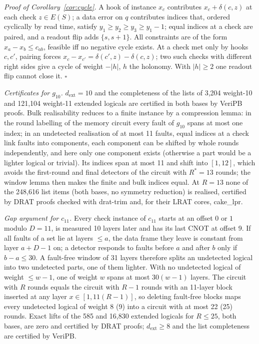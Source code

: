 \documentclass[aps,prl,twocolumn,superscriptaddress,nofootinbib]{revtex4-2}
\newif\ifshowclaimtags \showclaimtagsfalse
\newcommand{\cl}[1]{\ifshowclaimtags\textsuperscript{\textcolor{blue}{\scriptsize[#1]}}\fi}
\newcommand{\dext}{d_{\mathrm{ext}}}
\begin{document}
\emph{Proof of Corollary~\ref{cor:cycle}.} A hook of instance $x_c$ contributes
$x_c+\delta(c,z)$ at each check $z\in E(S)$; a data error on $q$ contributes indices that,
ordered cyclically by read time, satisfy $y_1\ge y_2\ge y_3\ge y_1-1$; equal indices at a
check are paired, and a readout flip adds $\{s,s+1\}$. All constraints are of the form
$x_a-x_b\le c_{ab}$, feasible iff no negative cycle exists. At a check met only by hooks
$c,c'$, pairing forces $x_c-x_{c'}=\delta(c',z)-\delta(c,z)$; two such checks with different
right sides give a cycle of weight $-|h|$, $h$ the holonomy. With $|h|\ge2$ one readout flip
cannot close it. $\square$

\emph{Certificates for $g_{10}$.} $\dext=10$ and the completeness of the lists of 3,204
weight-10 and 121,104 weight-11 extended logicals are certified in both bases by VeriPB
proofs. Bulk realisability reduces to a finite instance by a compression lemma: in the
round labelling of the memory circuit every fault of $g_{10}$ spans at most one index; in
an undetected realisation of at most 11 faults, equal indices at a check link faults into
components, each component can be shifted by whole rounds independently, and here only one
component exists (otherwise a part would be a lighter logical or trivial). Its indices
span at most 11 and shift into $[1,12]$, which avoids the first-round and final detectors
of the circuit with $R^*=13$ rounds; the window lemma then makes the finite and bulk
indices equal. At $R=13$ none of the 248,616 list items (both bases, no symmetry
reduction) is realised, certified by DRAT proofs checked with drat-trim and, for their LRAT
cores, cake\_lpr\cl{L-25}.

\emph{Gap argument for $c_{11}$.} Every check instance of $c_{11}$ starts at an offset
$0$ or $1$ modulo $D=11$, is measured 10 layers later and has its last CNOT at offset 9.
If all faults of a set lie at layers $\le a$, the data frame they leave is constant from
layer $a+D-1$ on; a detector responds to faults before $a$ and after $b$ only if $b-a\le30$.
A fault-free window of 31 layers therefore splits an undetected logical into two undetected
parts, one of them lighter. With no undetected logical of weight $\le w-1$, one of weight
$w$ spans at most $30(w-1)$ layers. The circuit with $R$ rounds equals the circuit with
$R-1$ rounds with an 11-layer block inserted at any layer $x\in[1,11(R-1)]$, so deleting
fault-free blocks maps every undetected logical of weight 8 (9) into a circuit with at
most 22 (25) rounds. Exact lifts of the 585 and 16,830 extended logicals for $R\le25$, both
bases, are zero and certified by DRAT proofs; $\dext\ge8$ and the list completeness are
certified by VeriPB\cl{L-5,L-15}.
\end{document}
